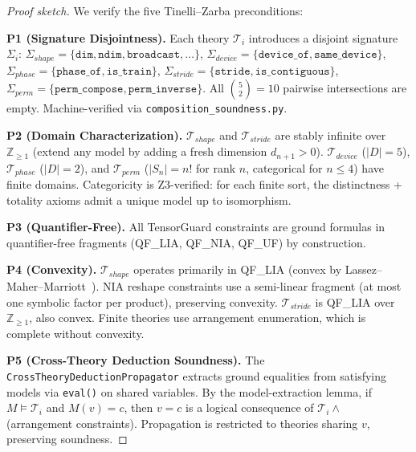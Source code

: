 \documentclass[11pt]{article}
\begin{document}
\begin{proof}[Proof sketch]
We verify the five Tinelli--Zarba preconditions:

\noindent\textbf{P1 (Signature Disjointness).}
Each theory $\mathcal{T}_i$ introduces a disjoint signature $\Sigma_i$:
$\Sigma_{\mathit{shape}} = \{\texttt{dim}, \texttt{ndim}, \texttt{broadcast}, \ldots\}$,
$\Sigma_{\mathit{device}} = \{\texttt{device\_of}, \texttt{same\_device}\}$,
$\Sigma_{\mathit{phase}} = \{\texttt{phase\_of}, \texttt{is\_train}\}$,
$\Sigma_{\mathit{stride}} = \{\texttt{stride}, \texttt{is\_contiguous}\}$,
$\Sigma_{\mathit{perm}} = \{\texttt{perm\_compose}, \texttt{perm\_inverse}\}$.
All $\binom{5}{2} = 10$ pairwise intersections are empty.
Machine-verified via \texttt{composition\_soundness.py}.

\noindent\textbf{P2 (Domain Characterization).}
$\mathcal{T}_{\mathit{shape}}$ and $\mathcal{T}_{\mathit{stride}}$
are stably infinite over $\mathbb{Z}_{\geq 1}$ (extend any model
by adding a fresh dimension $d_{n+1} > 0$).
$\mathcal{T}_{\mathit{device}}$ ($|D| = 5$),
$\mathcal{T}_{\mathit{phase}}$ ($|D| = 2$), and
$\mathcal{T}_{\mathit{perm}}$ ($|S_n| = n!$ for rank $n$, categorical for $n \leq 4$)
have finite domains.  Categoricity is Z3-verified: for each finite sort,
the distinctness + totality axioms admit a unique model up to isomorphism.

\noindent\textbf{P3 (Quantifier-Free).}
All TensorGuard constraints are ground formulas in quantifier-free
fragments (QF\_LIA, QF\_NIA, QF\_UF) by construction.

\noindent\textbf{P4 (Convexity).}
$\mathcal{T}_{\mathit{shape}}$ operates primarily in QF\_LIA (convex
by Lassez--Maher--Marriott~\cite{lassez88}).  NIA reshape constraints
use a semi-linear fragment (at most one symbolic factor per product),
preserving convexity.  $\mathcal{T}_{\mathit{stride}}$ is QF\_LIA over
$\mathbb{Z}_{\geq 1}$, also convex.  Finite theories use arrangement
enumeration, which is complete without convexity.

\noindent\textbf{P5 (Cross-Theory Deduction Soundness).}
The \texttt{CrossTheoryDeductionPropagator} extracts ground equalities
from satisfying models via \texttt{eval()} on shared variables.  By the
model-extraction lemma, if $M \models \mathcal{T}_i$ and $M(v) = c$,
then $v = c$ is a logical consequence of $\mathcal{T}_i \land$
(arrangement constraints).  Propagation is restricted to theories sharing
$v$, preserving soundness.


\end{proof}
\end{document}
